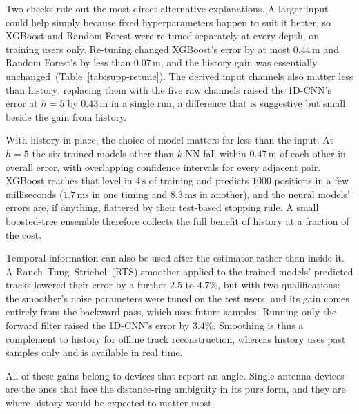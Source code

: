 Two checks rule out the most direct alternative explanations. A larger input could help simply because fixed hyperparameters happen to suit it better, so XGBoost and Random Forest were re-tuned separately at every depth, on training users only. Re-tuning changed XGBoost's error by at most $0.44\,\text{m}$ and Random Forest's by less than $0.07\,\text{m}$, and the history gain was essentially unchanged~(Table~\ref{tab:supp-retune}). The derived input channels also matter less than history: replacing them with the five raw channels raised the 1D-CNN's error at $h=5$ by $0.43\,\text{m}$ in a single run, a difference that is suggestive but small beside the gain from history.

With history in place, the choice of model matters far less than the input. At $h=5$ the six trained models other than $k$-NN fall within $0.47\,\text{m}$ of each other in overall error, with overlapping confidence intervals for every adjacent pair. XGBoost reaches that level in $4\,\text{s}$ of training and predicts $1000$ positions in a few milliseconds ($1.7\,\text{ms}$ in one timing and $8.3\,\text{ms}$ in another), and the neural models' errors are, if anything, flattered by their test-based stopping rule. A small boosted-tree ensemble therefore collects the full benefit of history at a fraction of the cost.

Temporal information can also be used after the estimator rather than inside it. A Rauch--Tung--Striebel~(RTS) smoother applied to the trained models' predicted tracks lowered their error by a further $2.5$ to $4.7\%$, but with two qualifications: the smoother's noise parameters were tuned on the test users, and its gain comes entirely from the backward pass, which uses future samples. Running only the forward filter raised the 1D-CNN's error by $3.4\%$. Smoothing is thus a complement to history for offline track reconstruction, whereas history uses past samples only and is available in real time.

All of these gains belong to devices that report an angle. Single-antenna devices are the ones that face the distance-ring ambiguity in its pure form, and they are where history would be expected to matter most.
